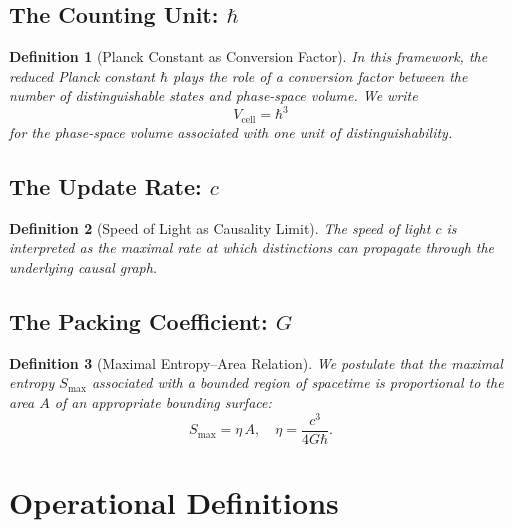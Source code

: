 \documentclass[12pt, a4paper]{article}
\newtheorem{definition}{Definition}
\begin{document}
\subsection{The Counting Unit: $\hbar$}

\begin{definition}[Planck Constant as Conversion Factor]
In this framework, the reduced Planck constant $\hbar$ plays the role of a conversion factor between the number of distinguishable states and phase-space volume. We write
\begin{equation}
    V_{\text{cell}} = \hbar^3
\end{equation}
for the phase-space volume associated with one unit of distinguishability.
\end{definition}

\subsection{The Update Rate: $c$}

\begin{definition}[Speed of Light as Causality Limit]
The speed of light $c$ is interpreted as the maximal rate at which distinctions can propagate through the underlying causal graph.
\end{definition}

\subsection{The Packing Coefficient: $G$}

\begin{definition}[Maximal Entropy--Area Relation]
We postulate that the maximal entropy $S_{\max}$ associated with a bounded region of spacetime is proportional to the area $A$ of an appropriate bounding surface:
\begin{equation}
    S_{\max} = \eta\, A, \quad \eta = \frac{c^3}{4 G \hbar}.
\end{equation}
\end{definition}


\section{Operational Definitions}
\end{document}
